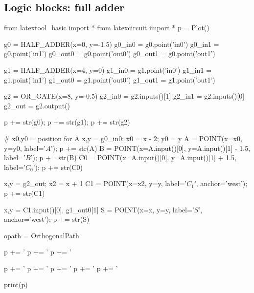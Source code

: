 \subsection{Logic blocks: full adder}
\begin{python}
from latextool_basic import *
from latexcircuit import *
p = Plot()

g0 = HALF_ADDER(x=0, y=-1.5)
g0_in0 = g0.point('in0')
g0_in1 = g0.point('in1')
g0_out0 = g0.point('out0')
g0_out1 = g0.point('out1')

g1 = HALF_ADDER(x=4, y=0)
g1_in0 = g1.point('in0')
g1_in1 = g1.point('in1')
g1_out0 = g1.point('out0')
g1_out1 = g1.point('out1')

g2 = OR_GATE(x=8, y=-0.5)
g2_in0 = g2.inputs()[1]
g2_in1 = g2.inputs()[0]
g2_out = g2.output()

p += str(g0); p += str(g1); p += str(g2)

# x0,y0 = position for A 
x,y = g0_in0; x0 = x - 2; y0 = y
A = POINT(x=x0, y=y0, label='$A$'); p += str(A)
B = POINT(x=A.input()[0], y=A.input()[1] - 1.5, label='$B$'); p += str(B)
C0 = POINT(x=A.input()[0], y=A.input()[1] + 1.5, label='$C_0$'); p += str(C0)

x,y = g2_out; x2 = x + 1
C1 = POINT(x=x2, y=y, label='$C_1$', anchor='west'); p += str(C1)

x,y = C1.input()[0], g1_out0[1]
S = POINT(x=x, y=y, label='$S$', anchor='west'); p += str(S)

opath = OrthogonalPath

p += '%
p += '%
p += '%

p += '%
p += '%
p += '%
p += '%
p += '%

print(p)
\end{python}


\newpage
